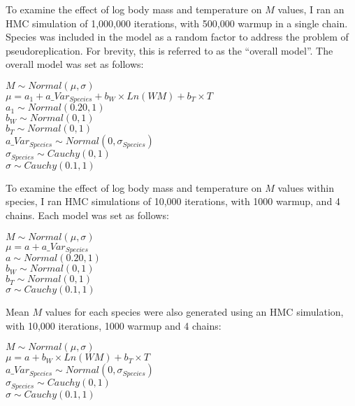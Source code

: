 \documentclass[12pt, titlepage]{article}
\begin{document}
To examine the effect of log body mass and temperature on $M$ values, I ran an HMC simulation of 1,000,000 iterations, with 500,000 warmup in a single chain. 
Species was included in the model as a random factor to address the problem of pseudoreplication. 
For brevity, this is referred to as the ``overall model''. 
The overall model was set as follows:

\begin{center}
$M \sim Normal(\mu, \sigma)$
\\$\mu = a_{1} + a\_Var_{Species} + b_{W} \times Ln(WM) + b_{T} \times T$
\\$a_{1} \sim Normal(0.20, 1)$
\\$b_{W} \sim Normal(0, 1)$
\\$b_{T} \sim Normal(0, 1)$
\\$a\_Var_{Species} \sim Normal(0, \sigma_{Species})$
\\$\sigma_{Species} \sim Cauchy(0, 1)$
\\$\sigma \sim Cauchy(0.1, 1)$
\end{center}

To examine the effect of log body mass and temperature on $M$ values within species, I ran HMC simulations of 10,000 iterations, with 1000 warmup, and 4 chains. 
Each model was set as follows:

\begin{center}
$M \sim Normal(\mu, \sigma)$
\\$\mu = a + a\_Var_{Species}$
\\$a \sim Normal(0.20, 1)$
\\$b_{W} \sim Normal(0, 1)$
\\$b_{T} \sim Normal(0, 1)$
\\$\sigma \sim Cauchy(0.1, 1)$
\end{center}

\pagebreak
Mean $M$ values for each species were also generated using an HMC simulation, with 10,000 iterations, 1000 warmup and 4 chains:

\begin{center}
$M \sim Normal(\mu, \sigma)$
\\$\mu = a + b_{W} \times Ln(WM) + b_{T} \times T$
\\$a\_Var_{Species} \sim Normal(0, \sigma_{Species})$
\\$\sigma_{Species} \sim Cauchy(0, 1)$
\\$\sigma \sim Cauchy(0.1, 1)$
\end{center}

\pagebreak
\end{document}
